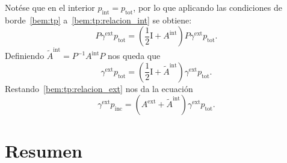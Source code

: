 \documentclass[11pt]{article}
\numberwithin{equation}{section}
\def\Idop{\textrm{I}}
\def\tot{\textrm{tot}}
\def\exterior{\textrm{ext}}
\def\interior{\textrm{int}}
\def\inc{\textrm{inc}}
\begin{document}
Notése que en el interior \(p_{\interior} = p_{\tot}\), por lo que aplicando las
condiciones de borde~\eqref{bem:tp} a~\eqref{bem:tp:relacion_int} se obtiene:
\begin{equation}
	P \gamma^{\exterior} p_{\tot}
	=
	\left( \frac{1}{2} \Idop + A^{\interior} \right) 
	P \gamma^{\exterior} p_{\tot}.
\end{equation}
Definiendo \(\tilde{A}^{\interior} = P^{-1} A^{\interior} P\) nos queda que
\begin{equation}
	\gamma^{\exterior} p_{\tot}
	=
	\left( \frac{1}{2} \Idop + \tilde{A}^{\interior} \right) 
	\gamma^{\exterior} p_{\tot}.
\end{equation}
Restando~\eqref{bem:tp:relacion_ext} nos da la ecuación
\begin{equation}
	\gamma^{\exterior} p_{\inc}
	=
	\left( A^{\exterior} + \tilde{A}^{\interior} \right) 
	\gamma^{\exterior} p_{\tot}.
\end{equation}

\section{Resumen}

\setlength{\arrayrulewidth}{.25mm}
\setlength{\tabcolsep}{.5cm}
\renewcommand{\arraystretch}{2}
\end{document}
